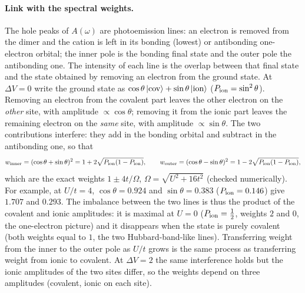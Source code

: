 \documentclass[11pt]{article}
\newcommand{\dV}{\Delta V}
\begin{document}
\iffalse
\paragraph{Link with the spectral weights.} The hole peaks of $A(\omega)$ are photoemission lines: an electron is removed from the dimer and the cation is left in its bonding (lowest) or
antibonding one-electron orbital; the inner pole is the bonding final state and the outer pole the antibonding one. The intensity of each line is the overlap between that final state and the state obtained by removing an
electron from the ground state. At $\dV=0$ write the ground state as $\cos\theta\,|{\rm cov}\rangle+\sin\theta\,|{\rm ion}\rangle$ ($P_{\rm ion}=\sin^2\theta$). Removing an electron from the covalent part leaves the other electron on the
\emph{other} site, with amplitude $\propto\cos\theta$; removing it from the ionic part leaves the remaining electron on the \emph{same} site, with amplitude $\propto\sin\theta$. The two contributions interfere:
they add in the bonding orbital and subtract in the antibonding one, so that
\[
w_{\rm inner}=(\cos\theta+\sin\theta)^2=1+2\sqrt{P_{\rm ion}(1-P_{\rm ion})},\qquad
w_{\rm outer}=(\cos\theta-\sin\theta)^2=1-2\sqrt{P_{\rm ion}(1-P_{\rm ion})},
\]
which are the exact weights $1\pm4t/\Omega$, $\Omega=\sqrt{U^2+16t^2}$ (checked numerically). For example, at $U/t=4$, $\cos\theta=0.924$ and $\sin\theta=0.383$ ($P_{\rm ion}=0.146$) give $1.707$ and $0.293$.
The imbalance between the two lines is thus the product of the covalent and ionic amplitudes: it is maximal at $U=0$ ($P_{\rm ion}=\tfrac12$, weights $2$ and $0$, the one-electron picture) and it disappears when the state is purely covalent
(both weights equal to $1$, the two Hubbard-band-like lines). Transferring weight from the inner to the outer pole as $U/t$ grows is the same process as transferring weight from ionic to covalent. At $\dV=2$ the same interference holds but the ionic amplitudes of the two sites differ, so the weights depend on three amplitudes
(covalent, ionic on each site).
\end{document}
